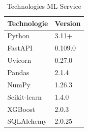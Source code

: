 \documentclass[12pt,a4paper]{report}
\begin{document}
\begin{table}[H]
    \centering
    \begin{tabular}{ll}
        \toprule
        \textbf{Technologie} & \textbf{Version} \\
        \midrule
        Python & 3.11+ \\
        FastAPI & 0.109.0 \\
        Uvicorn & 0.27.0 \\
        Pandas & 2.1.4 \\
        NumPy & 1.26.3 \\
        Scikit-learn & 1.4.0 \\
        XGBoost & 2.0.3 \\
        SQLAlchemy & 2.0.25 \\
        \bottomrule
    \end{tabular}
    \caption{Technologies ML Service}
\end{table}
\end{document}
